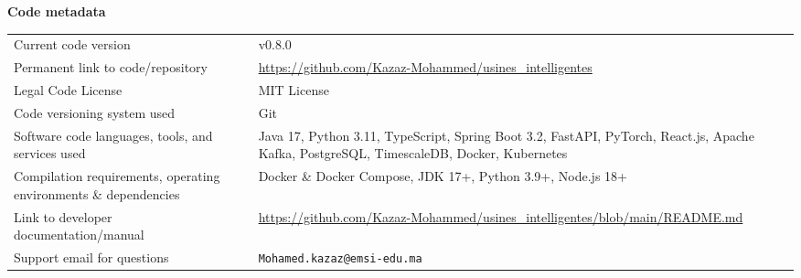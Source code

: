 \documentclass{ijceds} %
\begin{document}
\textbf{Code metadata}
\begin{table}[H]
\begin{center}
\begin{tabular}{p{6.5cm} p{10cm}}
\hline
Current code version & v0.8.0 \\
Permanent link to code/repository & \url{https://github.com/Kazaz-Mohammed/usines_intelligentes} \\
Legal Code License & MIT License \\
Code versioning system used & Git \\
Software code languages, tools, and services used & Java 17, Python 3.11, TypeScript, Spring Boot 3.2, FastAPI, PyTorch, React.js, Apache Kafka, PostgreSQL, TimescaleDB, Docker, Kubernetes \\
Compilation requirements, operating environments \& dependencies & Docker \& Docker Compose, JDK 17+, Python 3.9+, Node.js 18+ \\
Link to developer documentation/manual & \url{https://github.com/Kazaz-Mohammed/usines_intelligentes/blob/main/README.md} \\
Support email for questions & \texttt{Mohamed.kazaz@emsi-edu.ma} \\
\hline
\end{tabular}
\label{codeMetadata}
\end{center}
\end{table}
\end{document}

